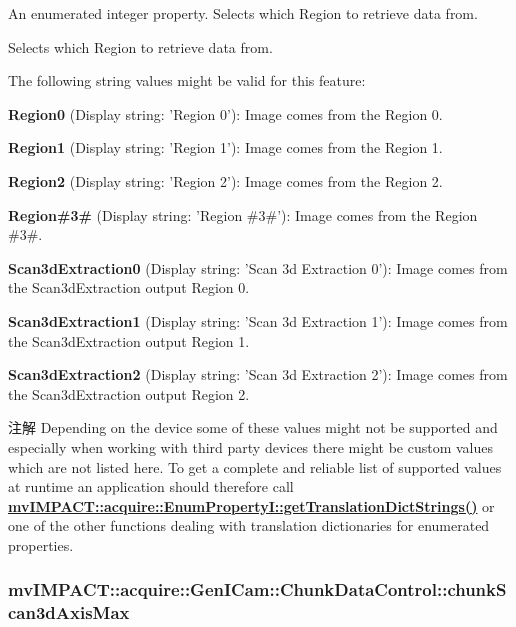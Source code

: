 An enumerated integer property. Selects which Region to retrieve data from. 

Selects which Region to retrieve data from.

The following string values might be valid for this feature\+:
\begin{DoxyItemize}
\item {\bfseries Region0} (Display string\+: 'Region 0')\+: Image comes from the Region 0.
\item {\bfseries Region1} (Display string\+: 'Region 1')\+: Image comes from the Region 1.
\item {\bfseries Region2} (Display string\+: 'Region 2')\+: Image comes from the Region 2.
\item {\bfseries Region\#3\#} (Display string\+: 'Region \#3\#')\+: Image comes from the Region \#3\#.
\item {\bfseries Scan3d\+Extraction0} (Display string\+: 'Scan 3d Extraction 0')\+: Image comes from the Scan3d\+Extraction output Region 0.
\item {\bfseries Scan3d\+Extraction1} (Display string\+: 'Scan 3d Extraction 1')\+: Image comes from the Scan3d\+Extraction output Region 1.
\item {\bfseries Scan3d\+Extraction2} (Display string\+: 'Scan 3d Extraction 2')\+: Image comes from the Scan3d\+Extraction output Region 2.
\end{DoxyItemize}

\begin{DoxyNote}{注解}
Depending on the device some of these values might not be supported and especially when working with third party devices there might be custom values which are not listed here. To get a complete and reliable list of supported values at runtime an application should therefore call {\bfseries \hyperlink{classmv_i_m_p_a_c_t_1_1acquire_1_1_enum_property_i_a0ba6ccbf5ee69784d5d0b537924d26b6}{mv\+I\+M\+P\+A\+C\+T\+::acquire\+::\+Enum\+Property\+I\+::get\+Translation\+Dict\+Strings()}} or one of the other functions dealing with translation dictionaries for enumerated properties. 
\end{DoxyNote}
\hypertarget{classmv_i_m_p_a_c_t_1_1acquire_1_1_gen_i_cam_1_1_chunk_data_control_a5307f0f9c4b623fb7315af85f9f1624c}{
\subsubsection[{chunk\+Scan3d\+Axis\+Max}]{ mv\+I\+M\+P\+A\+C\+T\+::acquire\+::\+Gen\+I\+Cam\+::\+Chunk\+Data\+Control\+::chunk\+Scan3d\+Axis\+Max}}\label{classmv_i_m_p_a_c_t_1_1acquire_1_1_gen_i_cam_1_1_chunk_data_control_a5307f0f9c4b623fb7315af85f9f1624c}


